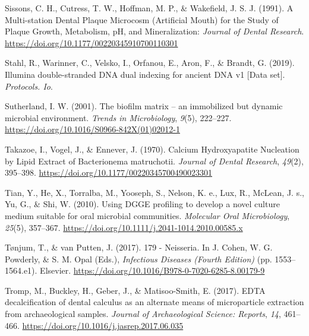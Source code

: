 \documentclass[
]{article}
\newlength{\cslhangindent}
\newlength{\cslentryspacingunit} %
\newenvironment{CSLReferences}[2] %
 {%
  \setlength{\parindent}{0pt}
  \ifodd #1
  \let\oldpar\par
  \def\par{\hangindent=\cslhangindent\oldpar}
  \fi
  \setlength{\parskip}{#2\cslentryspacingunit}
 }%
 {}
\begin{document}
\begin{CSLReferences}{1}{0}
\leavevmode{}%
Sissons, C. H., Cutress, T. W., Hoffman, M. P., \& Wakefield, J. S. J.
(1991). A {Multi-station Dental Plaque Microcosm} ({Artificial Mouth})
for the {Study} of {Plaque Growth}, {Metabolism}, {pH}, and
{Mineralization}: \emph{Journal of Dental Research}.
\url{https://doi.org/10.1177/00220345910700110301}

\leavevmode{}%
Stahl, R., Warinner, C., Velsko, I., Orfanou, E., Aron, F., \& Brandt,
G. (2019). Illumina double-stranded {DNA} dual indexing for ancient
{DNA} v1 {[}{Data} set{]}. \emph{Protocols. Io}.

\leavevmode{}%
Sutherland, I. W. (2001). The biofilm matrix -- an immobilized but
dynamic microbial environment. \emph{Trends in Microbiology},
\emph{9}(5), 222--227.
\url{https://doi.org/10.1016/S0966-842X(01)02012-1}

\leavevmode{}%
Takazoe, I., Vogel, J., \& Ennever, J. (1970). Calcium {Hydroxyapatite
Nucleation} by {Lipid Extract} of {Bacterionema} matruchotii.
\emph{Journal of Dental Research}, \emph{49}(2), 395--398.
\url{https://doi.org/10.1177/00220345700490023301}

\leavevmode{}%
Tian, Y., He, X., Torralba, M., Yooseph, S., Nelson, K. e., Lux, R.,
McLean, J. s., Yu, G., \& Shi, W. (2010). Using {DGGE} profiling to
develop a novel culture medium suitable for oral microbial communities.
\emph{Molecular Oral Microbiology}, \emph{25}(5), 357--367.
\url{https://doi.org/10.1111/j.2041-1014.2010.00585.x}

\leavevmode{}%
Tønjum, T., \& van Putten, J. (2017). 179 - {Neisseria}. In J. Cohen, W.
G. Powderly, \& S. M. Opal (Eds.), \emph{Infectious {Diseases} ({Fourth
Edition})} (pp. 1553--1564.e1). {Elsevier}.
\url{https://doi.org/10.1016/B978-0-7020-6285-8.00179-9}

\leavevmode{}%
Tromp, M., Buckley, H., Geber, J., \& Matisoo-Smith, E. (2017). {EDTA}
decalcification of dental calculus as an alternate means of
microparticle extraction from archaeological samples. \emph{Journal of
Archaeological Science: Reports}, \emph{14}, 461--466.
\url{https://doi.org/10.1016/j.jasrep.2017.06.035}


\end{CSLReferences}
\end{document}
